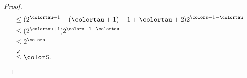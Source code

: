 \begin{proof}
\begin{align*}
&\leq
(2^{\colortau + 1} - (\colortau + 1) - 1 + \colortau + 2) 2^{\colors - 1 - \colortau}\\
&\leq
(2^{\colortau + 1}) 2^{\colors - 1 - \colortau}\\
&\leq
2^{\colors}\\
&\stackrel{\checkmark}\leq
\colorS.
\end{align*}



\end{proof}
